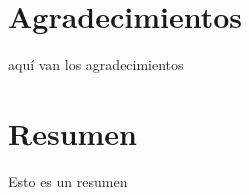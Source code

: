 \documentclass[12pt,a4paper,Spanish]{article}
\newcommand\blankpage{%
	\null
	\thispagestyle{empty}%
	\newpage}
\begin{document}
\section*{Agradecimientos} %

aquí van los agradecimientos









\newpage
\section*{Resumen}
Esto es un resumen











\newpage
\renewcommand*\contentsname{ÍNDICE} %
\tableofcontents
\afterpage{\blankpage} %




\newpage
\renewcommand{\listtablename}{ÍNDICE DE TABLAS} %
\listoftables %




\newpage
\renewcommand{\listfigurename}{ÍNDICE DE FIGURAS} %
\listoffigures %
\end{document}
